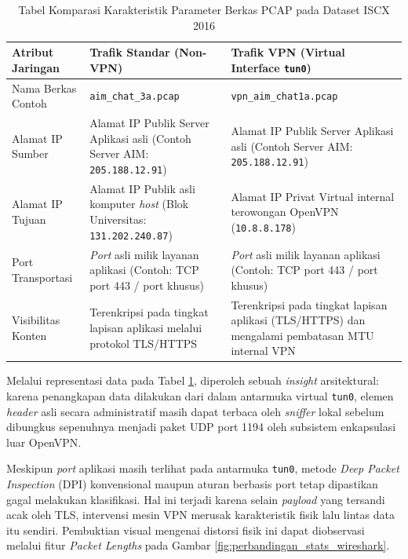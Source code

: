 \begin{table}[h!]
\centering
\caption{Tabel Komparasi Karakteristik Parameter Berkas PCAP pada Dataset ISCX 2016}
\label{tab:komparasi_pcap_iscx}
\begin{tabular}{|l|p{5.5cm}|p{5.5cm}|}
\hline
\textbf{Atribut Jaringan} & \textbf{Trafik Standar (Non-VPN)} & \textbf{Trafik VPN (Virtual Interface \texttt{tun0})} \\ \hline
Nama Berkas Contoh & \texttt{aim\_chat\_3a.pcap} & \texttt{vpn\_aim\_chat1a.pcap} \\ \hline
Alamat IP Sumber & Alamat IP Publik Server Aplikasi asli (Contoh Server AIM: \texttt{205.188.12.91}) & Alamat IP Publik Server Aplikasi asli (Contoh Server AIM: \texttt{205.188.12.91})\\ \hline
Alamat IP Tujuan & Alamat IP Publik asli komputer \textit{host} (Blok Universitas: \texttt{131.202.240.87}) & Alamat IP Privat Virtual internal terowongan OpenVPN (\texttt{10.8.8.178}) \\ \hline
Port Transportasi & \textit{Port} asli milik layanan aplikasi (Contoh: TCP port 443 / port khusus) & \textit{Port} asli milik layanan aplikasi (Contoh: TCP port 443 / port khusus) \\ \hline
Visibilitas Konten & Terenkripsi pada tingkat lapisan aplikasi melalui protokol TLS/HTTPS & Terenkripsi pada tingkat lapisan aplikasi (TLS/HTTPS) dan mengalami pembatasan MTU internal VPN \\ \hline
\end{tabular}
\end{table}

Melalui representasi data pada Tabel \ref{tab:komparasi_pcap_iscx}, diperoleh sebuah \textit{insight} arsitektural: karena penangkapan data dilakukan dari dalam antarmuka virtual \texttt{tun0}, elemen \textit{header} asli secara administratif masih dapat terbaca oleh \textit{sniffer} lokal sebelum dibungkus sepenuhnya menjadi paket UDP port 1194 oleh subsistem enkapsulasi luar OpenVPN. 

Meskipun \textit{port} aplikasi masih terlihat pada antarmuka \texttt{tun0}, metode \textit{Deep Packet Inspection} (DPI) konvensional maupun aturan berbasis port tetap dipastikan gagal melakukan klasifikasi. Hal ini terjadi karena selain \textit{payload} yang tersandi acak oleh TLS, intervensi mesin VPN merusak karakteristik fisik lalu lintas data itu sendiri. Pembuktian visual mengenai distorsi fisik ini dapat diobservasi melalui fitur \textit{Packet Lengths} pada Gambar \ref{fig:perbandingan_stats_wireshark}.

